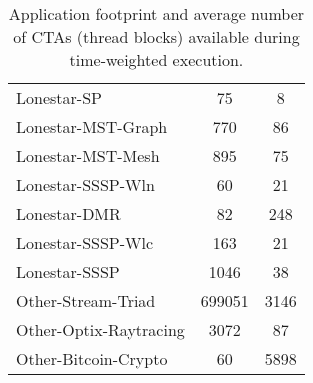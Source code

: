 \begin{table}[t]
\begin{small}
\begin{tabular}{lcc}
Lonestar-SP & 75 & 8 \\
Lonestar-MST-Graph & 770 & 86 \\
Lonestar-MST-Mesh & 895 & 75 \\
Lonestar-SSSP-Wln & 60 & 21 \\
Lonestar-DMR  & 82 & 248 \\
Lonestar-SSSP-Wlc  & 163 & 21 \\
Lonestar-SSSP  & 1046 & 38 \\
Other-Stream-Triad  & 699051 & 3146 \\
Other-Optix-Raytracing  & 3072 & 87 \\
Other-Bitcoin-Crypto  & 60 & 5898 \\
\toprule
\end{tabular}
\vspace{-.1in}
\caption{Application footprint and average number of CTAs (thread blocks) 
available during time-weighted execution.}
\vspace{-.2in}
\label{tab:numctas}
\end{small}
\end{table}


